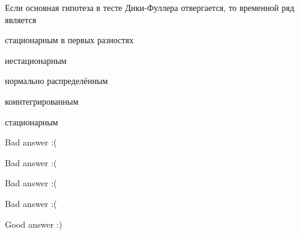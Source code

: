 
\begin{question}
Если основная гипотеза в тесте Дики-Фуллера отвергается, то временной ряд является
\begin{answerlist}
  \item стационарным в первых разностях
  \item нестационарным
  \item нормально распределённым
  \item коинтегрированным
  \item стационарным
\end{answerlist}
\end{question}

\begin{solution}
\begin{answerlist}
  \item Bad answer :(
  \item Bad answer :(
  \item Bad answer :(
  \item Bad answer :(
  \item Good answer :)
\end{answerlist}
\end{solution}

